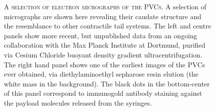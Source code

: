\vspace{0.1cm}
\begin{figure}[h]
\centering
    \begin{subfigure}[b]{0.33\textwidth}
        \centering
        {%
\setlength{\fboxsep}{0pt}%
\setlength{\fboxrule}{1pt}%
            }%
    \end{subfigure}%
    \begin{subfigure}[t]{0.33\textwidth}
        \centering
        {%
\setlength{\fboxsep}{0pt}%
\setlength{\fboxrule}{1pt}%
        }%
        \end{subfigure}%
    \begin{subfigure}[t]{0.33\textwidth}
        \centering
        {%
\setlength{\fboxsep}{0pt}%
\setlength{\fboxrule}{1pt}%
        }%
    \end{subfigure}%

\captionsetup{singlelinecheck=off, justification=justified, font=footnotesize, aboveskip=10pt}
\caption[PVC Electron Micrographs]{\textsc{\normalsize A selection of electron micrographs of the PVCs.}\vspace{0.1cm} \newline A selection of micrographs are shown here revealing their caudate structure and the resemblance to other contractile tail systems. The left and centre panels show more recent, but unpublished data from an ongoing collaboration with the Max Planck Institute at Dortmund, purified via Cesium Chloride buoyant density gradient ultracentrifugation. The right hand panel shows one of the earliest images of the PVCs ever obtained, via diethylaminoethyl sepharose resin elution (the white mass in the background). The black dots in the bottom-center of this panel correspond to immunogold antibody staining against the payload molecules released from the syringes.}
\label{PVCems}
\end{figure}


